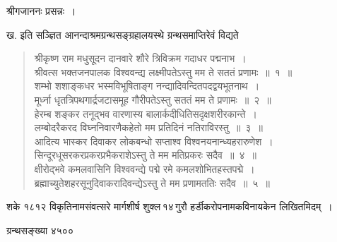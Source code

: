 \documentclass[11pt, openany]{book}
\begin{document}
\begin{sloppypar}
\begin{center}
श्रीगजाननः प्रसन्नः~। 
\end{center}

ख. इति सञ्ज्ञित आनन्दाश्रमग्रन्थसङ्ग्रहालयस्थे ग्रन्थसमाप्तिरेवं विद्यते\textendash 

\begin{quote}
श्रीकृष्ण राम मधुसूदन दानवारे शौरे त्रिविक्रम गदाधर पद्मनाभ~। \\
श्रीवत्स भक्तजनपालक विश्ववन्द्य लक्ष्मीपतेऽस्तु मम ते सततं प्रणामः~॥~१~॥ \\
शम्भो शशाङ्कधर भस्मविभूषिताङ्ग नन्द्यादिवन्दितपदद्वयभूतनाथ~। \\
मूर्ध्ना धृतत्रिपथगार्द्रजटासमूह गौरीपतेऽस्तु सततं मम ते प्रणामः~॥~२~॥ \\
हेरम्ब शङ्कर तनूद्भव वारणास्य बालार्कदीधितिसदृक्षशरीरकान्ते~। \\
लम्बोदरैकरद विघ्ननिवारणैकहेतो मम प्रतिदिनं नतिराविरस्तु~॥~३~॥ \\
आदित्य भास्कर दिवाकर लोकबन्धो सप्ताश्व विश्वनयनान्ध्यहरारुणेश~। \\
सिन्दूरधूसरकरप्रकरप्रभैकराशेऽस्तु ते मम मतिप्रकरः सदैव~॥~४~॥ \\
क्षीरोद्भवे कमलवासिनि विश्ववन्द्ये पद्मे रमे कमलशोभितहस्तपद्मे~। \\
ब्रह्माच्युतेशहरसूनुदिवाकरादिवन्द्येऽस्तु ते मम प्रणामततिः सदैव~॥~५~॥ 
\end{quote}

शके १८१२ विकृतिनामसंवत्सरे मार्गशीर्ष शुक्ल\textendash \,१४\textendash \,गुरौ हर्डीकरोपनामकविनायकेन लिखितमिदम्~। 

\begin{center}
ग्रन्थसङ्ख्या ४५००
\end{center}
\end{sloppypar}

\newpage
\end{document}
